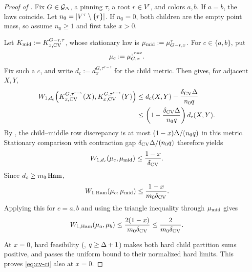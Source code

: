 \begin{proof}[Proof of ]
Fix \(G\in\Gdeg\), a pinning \(\tau\), a root \(r\in V^\tau\), and
colors \(a,b\). If
\(a=b\), the laws coincide.  Let \(n_0=\abs{V^\tau\setminus\{r\}}\).  If
\(n_0=0\), both children are the empty point mass, so assume \(n_0\ge1\)
and first take \(x>0\).

Let \(K_{\rm mid}:=K_{x,\mathrm{CV}}^{G-r,\tau}\), whose stationary law is
\(\mu_{\rm mid}:=\mupin{G-r}{\tau}{x}\). For \(c\in\{a,b\}\), put
\[
  \mu_c:=\mupin{G}{\tau^{r=c}}{x}.
\]
Fix such a \(c\), and write \(d_c:=d_x^{G,\tau^{r=c}}\) for the child metric.
Then
 gives, for adjacent \(X,Y\),
\[
\begin{aligned}
  W_{1,d_c}\!\left(
      K_{x,\mathrm{CV}}^{G,\tau^{r=c}}(X),
      K_{x,\mathrm{CV}}^{G,\tau^{r=c}}(Y)\right)
  &\le d_c(X,Y)-\frac{\delta_{\rm CV}\Deg}{n_0q}\\
  &\le\left(1-\frac{\delta_{\rm CV}\Deg}{n_0q}\right)
       d_c(X,Y).
\end{aligned}
\]
By , the child--middle row discrepancy is at most
\((1-x)\Deg/(n_0q)\) in this metric.  Stationary comparison with
contraction gap \(\delta_{\rm CV}\Deg/(n_0q)\) therefore yields
\[
  W_{1,d_c}(\mu_c,\mu_{\rm mid})
  \le\frac{1-x}{\delta_{\rm CV}}.
\]
Since \(d_c\ge m_0\Ham\),
\[
  \WHam(\mu_c,\mu_{\rm mid})
  \le\frac{1-x}{m_0\delta_{\rm CV}}.
\]
Applying this for \(c=a,b\) and using the triangle inequality through
\(\mu_{\rm mid}\) gives
\[
  \WHam(\mu_a,\mu_b)
  \le\frac{2(1-x)}{m_0\delta_{\rm CV}}
  \le\frac{2}{m_0\delta_{\rm CV}}.
\]

At \(x=0\), hard feasibility (, \(q\ge\Deg+1\))
makes both hard child partition sums positive, and
 passes the uniform bound to their
normalized hard limits. This proves \eqref{eq:cv-ci} also at \(x=0\).
\end{proof}
